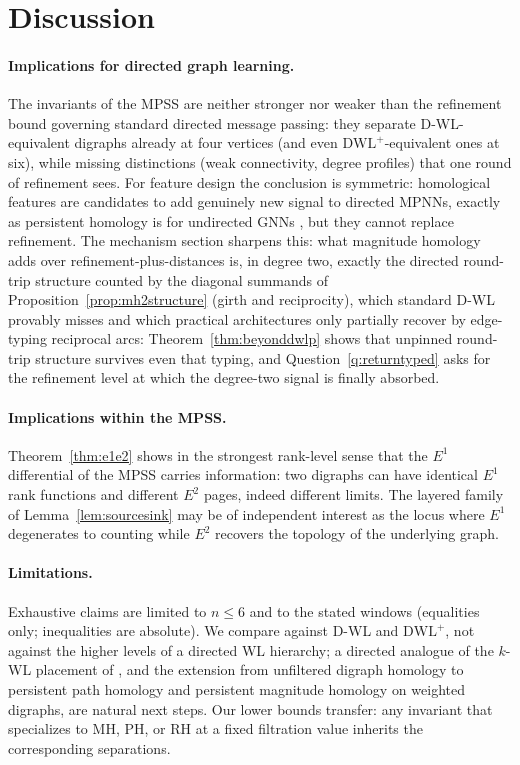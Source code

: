 \documentclass[pdflatex,sn-mathphys,Numbered]{sn-jnl}
\theoremstyle{thmstyleone}
\theoremstyle{thmstyletwo}
\newcommand{\MH}{\mathrm{MH}}
\newcommand{\PH}{\mathrm{PH}}
\newcommand{\RH}{\mathrm{RH}}
\newcommand{\dwlp}{\mathrm{DWL}^{+}}
\begin{document}
\section{Discussion}\label{sec:discussion}

\paragraph{Implications for directed graph learning.}
The invariants of the MPSS are neither stronger nor weaker than the
refinement bound governing standard directed message passing: they
separate D-WL-equivalent digraphs already at four vertices (and even
$\dwlp$-equivalent ones at six), while missing distinctions (weak
connectivity, degree profiles) that one round of refinement sees. For
feature design the conclusion is symmetric: homological features are
candidates to add genuinely new signal to directed MPNNs, exactly as
persistent homology is for undirected GNNs \cite{BallesterRieck25}, but
they cannot replace refinement. The mechanism section sharpens
this: what magnitude homology adds over refinement-plus-distances is, in
degree two, exactly the directed round-trip structure counted by the
diagonal summands of Proposition~\ref{prop:mh2structure} (girth and
reciprocity), which standard D-WL provably misses and which practical
architectures only partially recover by edge-typing reciprocal arcs:
Theorem~\ref{thm:beyonddwlp} shows that unpinned round-trip structure
survives even that typing, and Question~\ref{q:returntyped} asks for the
refinement level at which the degree-two signal is finally absorbed.

\paragraph{Implications within the MPSS.}
Theorem~\ref{thm:e1e2} shows in the strongest rank-level sense that the
$E^1$ differential of the MPSS carries information: two digraphs can have
identical $E^1$ rank functions and different $E^2$ pages, indeed
different limits. The layered family of Lemma~\ref{lem:sourcesink} may be
of independent interest as the locus where $E^1$ degenerates to counting
while $E^2$ recovers the topology of the underlying graph.

\paragraph{Limitations.}
Exhaustive claims are limited to $n \le 6$ and to the stated windows
(equalities only; inequalities are absolute). We compare against D-WL and
$\dwlp$, not against the higher levels of a directed WL hierarchy; a
directed analogue of the $k$-WL placement of \cite{BallesterRieck25}, and
the extension from unfiltered digraph homology to persistent path
homology \cite{ChowdhuryMemoli18} and persistent magnitude homology
\cite{BiFengLiWu26} on weighted digraphs, are natural next steps. Our
lower bounds transfer: any invariant that specializes to $\MH$, $\PH$, or
$\RH$ at a fixed filtration value inherits the corresponding
separations.
\end{document}
